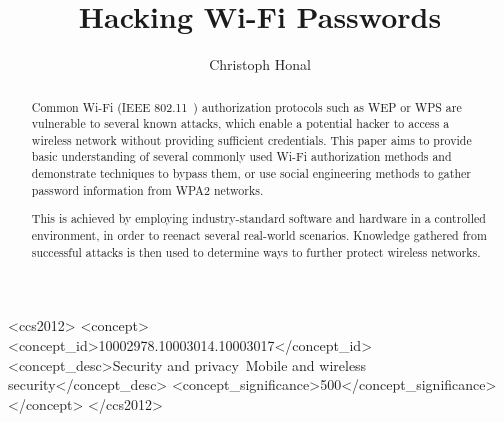 \documentclass[sigconf]{acmart}
\begin{document}
\title{Hacking Wi-Fi Passwords}

\author{Christoph Honal}

\begin{abstract}
Common Wi-Fi (IEEE 802.11~\cite{WiFi16}) authorization protocols such as WEP or WPS are vulnerable to several known attacks, which enable a potential hacker to access a wireless network without providing sufficient credentials. This paper aims to provide basic understanding of several commonly used Wi-Fi authorization methods and demonstrate techniques to bypass them, or use social engineering methods to gather password information from WPA2 networks. 

This is achieved by employing industry-standard software and hardware in a controlled environment, in order to reenact several real-world scenarios. Knowledge gathered from successful attacks is then used to determine ways to further protect wireless networks.
\end{abstract}

\begin{CCSXML}
<ccs2012>
<concept>
<concept_id>10002978.10003014.10003017</concept_id>
<concept_desc>Security and privacy~Mobile and wireless security</concept_desc>
<concept_significance>500</concept_significance>
</concept>
</ccs2012>
\end{CCSXML}



\maketitle





\end{document}
